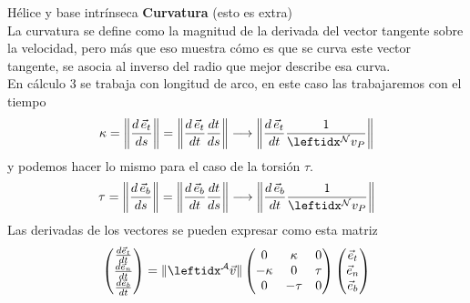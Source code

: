 \begin{solucion}{Hélice y base intrínseca}
\textbf{Curvatura} (esto es extra)\\
La curvatura se define como la magnitud de la derivada del vector tangente sobre la velocidad, pero más que eso muestra cómo es que se curva este vector tangente, se asocia al inverso del radio que mejor describe esa curva.\\
En cálculo 3 se trabaja con longitud de arco, en este caso las trabajaremos con el tiempo
$$\kappa=\left\|\dfrac{d \,\vec{e}_t}{ds}\right\|=\left\|\dfrac{d \,\vec{e}_t}{dt}\dfrac{dt}{ds}\right\|\longrightarrow\left\|\dfrac{d \,\vec{e}_t}{dt}\dfrac{1}{\marc{}{N}v_P } \right\|$$
y podemos hacer lo mismo para el caso de la torsión $\tau$.
$$\tau=\left\|\dfrac{d \,\vec{e}_b}{ds}\right\|=\left\|\dfrac{d \,\vec{e}_b}{dt}\dfrac{dt}{ds}\right\|\longrightarrow\left\|\dfrac{d \,\vec{e}_b}{dt}\dfrac{1}{\marc{}{N}v_P } \right\|$$
Las derivadas de los vectores se pueden expresar como esta matriz
\[
\begin{pmatrix}
\frac{d\vec{e}_t}{dt}\\ \frac{d\vec{e}_n}{dt}\\\frac{d\vec{e}_b}{dt}
\end{pmatrix}
=
\|\marc{\vec{v}}{A}\|
\begin{pmatrix}
0 & \kappa & 0 \\
-\kappa & 0 & \tau \\
0 & -\tau & 0
\end{pmatrix}
\begin{pmatrix}
\vec{e}_t \\
\vec{e}_n \\
\vec{e}_b
\end{pmatrix}
\]

\end{solucion}
